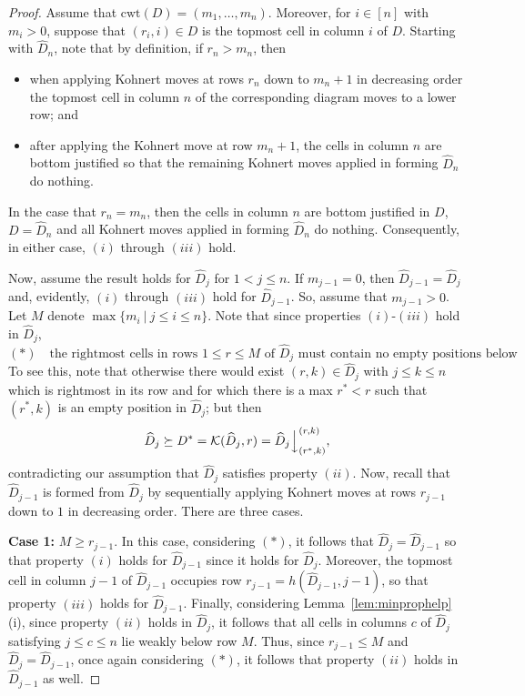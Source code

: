 \documentclass[10pt,a4paper]{amsart}
\newcommand{\ldownarrow}{\Big\downarrow}
\begin{document}
\begin{proof}
    Assume that $\mathrm{cwt}(D)=(m_1,\hdots,m_n)$. Moreover, for $i\in [n]$ with $m_i>0$, suppose that $(r_i,i)\in D$ is the topmost cell in column $i$ of $D$. Starting with $\widehat{D}_{n}$, note that by definition, if $r_n>m_n$, then 
    \begin{itemize}
        \item when applying Kohnert moves at rows $r_n$ down to $m_n+1$ in decreasing order the topmost cell in column $n$ of the corresponding diagram moves to a lower row; and
        \item after applying the Kohnert move at row $m_n+1$, the cells in column $n$ are bottom justified so that the remaining Kohnert moves applied in forming $\widehat{D}_{n}$ do nothing.
    \end{itemize}
    In the case that $r_n=m_n$, then the cells in column $n$ are bottom justified in $D$, $D=\widehat{D}_{n}$ and all Kohnert moves applied in forming $\widehat{D}_{n}$ do nothing. Consequently, in either case, $(i)$ through $(iii)$ hold.

    Now, assume the result holds for $\widehat{D}_{j}$ for $1<j\le n$. If $m_{j-1}=0$, then $\widehat{D}_{j-1}=\widehat{D}_{j}$ and, evidently, $(i)$ through $(iii)$ hold for $\widehat{D}_{j-1}$. So, assume that $m_{j-1}>0$. Let $M$ denote $\max\{m_i~|~j\le i\le n\}$. Note that since properties $(i)$-$(iii)$ hold in $\widehat{D}_{j}$, $$(\ast)\quad \text{the rightmost cells in rows $1\le r\le M$ of $\widehat{D}_j$ must contain no empty positions below}.$$ To see this, note that otherwise there would exist $(r,k)\in \widehat{D}_{j}$ with $j\le k\le n$ which is rightmost in its row and for which there is a max $r^*<r$ such that $(r^*,k)$ is an empty position in $\widehat{D}_{j}$; but then $$\widehat{D}_{j}\succeq D^*=\mathcal{K}(\widehat{D}_{j},r)=\widehat{D}_{j}\ldownarrow^{(r,k)}_{(r^*,k)},$$ contradicting our assumption that $\widehat{D}_{j}$ satisfies property $(ii)$. Now, recall that $\widehat{D}_{j-1}$ is formed from $\widehat{D}_{j}$ by sequentially applying Kohnert moves at rows $r_{j-1}$ down to $1$ in decreasing order. There are three cases.
    \bigskip

    \noindent
    \textbf{Case 1:} $M\ge r_{j-1}$. In this case, considering $(\ast)$, it follows that $\widehat{D}_{j}=\widehat{D}_{j-1}$ so that property $(i)$ holds for $\widehat{D}_{j-1}$ since it holds for $\widehat{D}_{j}$. Moreover, the topmost cell in column $j-1$ of $\widehat{D}_{j-1}$ occupies row $r_{j-1}=h(\widehat{D}_{j-1},j-1)$, so that property $(iii)$ holds for $\widehat{D}_{j-1}$. Finally, considering Lemma~\ref{lem:minprophelp} (i), since property $(ii)$ holds in $\widehat{D}_j$, it follows that all cells in columns $c$ of $\widehat{D}_j$ satisfying $j\le c\le n$ lie weakly below row $M$. Thus, since $r_{j-1}\le M$ and $\widehat{D}_{j}=\widehat{D}_{j-1}$, once again considering $(\ast)$, it follows that property $(ii)$ holds in $\widehat{D}_{j-1}$ as well.
    \bigskip


\end{proof}
\end{document}
